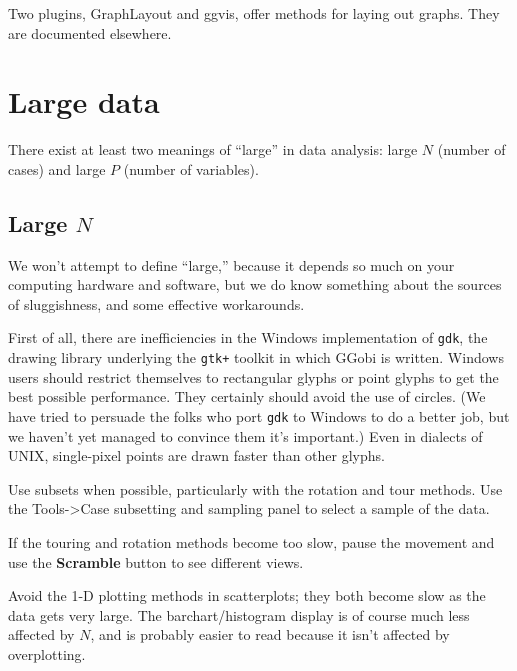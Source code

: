 \documentclass[11pt]{article}
\begin{document}
Two plugins, GraphLayout and ggvis, offer methods for laying out
graphs.  They are documented elsewhere.

\section{Large data}

There exist at least two meanings of ``large'' in data analysis: large
$N$ (number of cases) and large $P$ (number of variables).  

\subsection{Large $N$}

We won't attempt to define ``large,'' because it depends so much on
your computing hardware and software, but we do know something about
the sources of sluggishness, and some effective workarounds.

First of all, there are inefficiencies in the Windows implementation
of \verb|gdk|, the drawing library underlying the \verb|gtk+| toolkit
in which GGobi is written.  Windows users should restrict themselves to
rectangular glyphs or point glyphs to get the best possible performance.
They certainly should avoid the use of circles.  (We have tried to
persuade the folks who port \verb|gdk| to Windows to do a better job,
but we haven't yet managed to convince them it's important.)  Even in
dialects of UNIX, single-pixel points are drawn faster than other glyphs.

Use subsets when possible, particularly with the rotation and tour
methods.  Use the Tools->Case subsetting and sampling panel to select
a sample of the data.

If the touring and rotation methods become too slow, pause the movement
and use the {\bf Scramble} button to see different views.

Avoid the 1-D plotting methods in scatterplots; they both become slow
as the data gets very large.  The barchart/histogram display is of course
much less affected by $N$, and is probably easier to read because it
isn't affected by overplotting.
\end{document}
